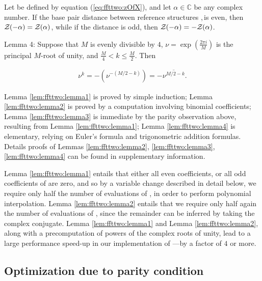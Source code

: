 \begin{lemma}
\label{lem:ffttwo:lemma3}
Let \emZ{} be defined by equation (\ref{eq:ffttwo:zOfX}), and
let $\alpha \in \mathbb{C}$ be any complex number.
If the base pair distance between reference
structures \strA,\,\strB is even, then ${\mathcal Z}_{}(-\alpha) = {\mathcal Z}_{}(\alpha)$,
while if
the distance is odd, then ${\mathcal Z}_{}(-\alpha) = -{\mathcal Z}_{}(\alpha)$.
\end{lemma}

\begin{lemma}
\label{lem:ffttwo:lemma4}
{\sc Lemma 4:} Suppose that $M$ is evenly divisible by $4$,
$\nu = \exp(\frac{2 \pi i}{M})$ is the principal $M$-root of unity, and
$\frac{M}{4} < k \leq \frac{M}{2}$. Then

\begin{align}
\nu^k = -(\nu^{-(M/2-k)}) = -\overline{\nu^{M/2-k}}.
\end{align}
\end{lemma}

Lemma \ref{lem:ffttwo:lemma1} is proved by simple induction;
Lemma \ref{lem:ffttwo:lemma2}
is proved by a computation involving binomial coefficients;
Lemma \ref{lem:ffttwo:lemma3} is immediate
by the parity observation above, resulting from Lemma \ref{lem:ffttwo:lemma1};
Lemma \ref{lem:ffttwo:lemma4} is elementary, relying on Euler's
formula and trigonometric addition formulas. Details proofs of
Lemmas \ref{lem:ffttwo:lemma2}, \ref{lem:ffttwo:lemma3}, \ref{lem:ffttwo:lemma4}
can be found in supplementary information.

Lemma \ref{lem:ffttwo:lemma1}
entails that either all even coefficients, or all odd coefficients
of \emZ{} are zero, and so by a variable change described in detail below,
we require only half the number of evaluations of \emZ{}, in order to perform
polynomial interpolation.
Lemma \ref{lem:ffttwo:lemma2}
 entails that we require only half again the number of evaluations of
\emZ{}, since the remainder can be inferred by taking the complex conjugate.
Lemma \ref{lem:ffttwo:lemma1} and Lemma \ref{lem:ffttwo:lemma2},
along with a
precomputation of powers of the complex roots of unity, lead to a
large performance speed-up in our implementation of \ffttwo---by a factor
of $4$ or more.

\subsection{Optimization due to parity condition}
\label{subsec:ffttwo:parity}

